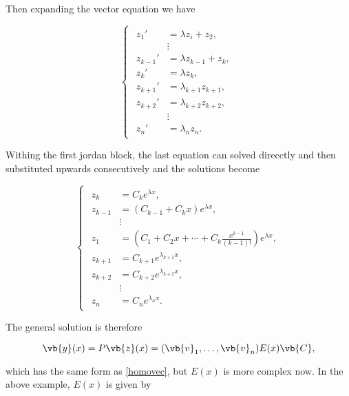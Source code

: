 \documentclass[english,a4paper,12pt]{report}
\begin{document}
Then expanding the vector equation we have

\begin{equation}
    \begin{cases}
    \begin{aligned} 
    z _{1}' &= \lambda z _{i} + z _{2},\\ 
    &\vdots \\
    z _{k-1}' &= \lambda z _{k-1} + z _{k},\\
    z _{k}' &= \lambda z _{k},\\  
    z_{k+1}' &= \lambda _{k+1}z_{k+1}, \\
    z_{k+2}' &= \lambda _{k+2}z_{k+2},\\
    &\vdots \\
    z_{n}' &= \lambda _{n} z_{n}.          
    \end{aligned}  
    \end{cases}
\end{equation}

Withing the first jordan block, the last equation can solved direcctly and then substituted upwards consecutively and the solutions become

\begin{equation}\
    \begin{cases}
    \begin{aligned}
        z _{k} &= C_{k}e^{\lambda x },\\
        z _{k-1} &= (C_{k-1} + C_{k}x  ) e^{\lambda x},\\
        &\vdots \\
        z _{1} &= \left( C_1 + C_2 x+ \cdots +C_{k} \frac{x^{k-1} }{(k-1)!} \right) e^{\lambda x },\\
        z_{k+1} &= C_{k+1}e^{\lambda _{k+1}x },\\
        z_{k+2} &= C_{k+2}e^{\lambda _{k+2}x },\\
        &\vdots \\
        z_{n} &= C_{n}e^{\lambda _{n}x }.        
    \end{aligned}
    \end{cases}
\end{equation}

The general solution is therefore

\begin{equation}
    \vb{y} (x) = P\vb{z} (x) = (\vb{v} _{1}, \ldots ,\vb{v} _{n}  )E(x)\vb{C} ,
\end{equation}

which has the same form as \cref{homovec}, but \(E(x)\) is more complex now. In the above example, \(E(x)\) is given by 
\end{document}
